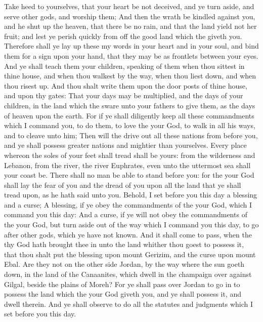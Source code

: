 \begin{biblechapter}
\verse Take heed to yourselves, that your heart be not deceived, and ye turn aside, and serve other gods, and worship them;
\verse And then the \LORDs wrath be kindled against you, and he shut up the heaven, that there be no rain, and that the land yield not her fruit; and lest ye perish quickly from off the good land which the \LORD giveth you.
\verse Therefore shall ye lay up these my words in your heart and in your soul, and bind them for a sign upon your hand, that they may be as frontlets between your eyes.
\verse And ye shall teach them your children, speaking of them when thou sittest in thine house, and when thou walkest by the way, when thou liest down, and when thou risest up.
\verse And thou shalt write them upon the door posts of thine house, and upon thy gates:
\verse That your days may be multiplied, and the days of your children, in the land which the \LORD sware unto your fathers to give them, as the days of heaven upon the earth.
\verse For if ye shall diligently keep all these commandments which I command you, to do them, to love the \LORD your God, to walk in all his ways, and to cleave unto him;
\verse Then will the \LORD drive out all these nations from before you, and ye shall possess greater nations and mightier than yourselves.
\verse Every place whereon the soles of your feet shall tread shall be yours: from the wilderness and Lebanon, from the river, the river Euphrates, even unto the uttermost sea shall your coast be.
\verse There shall no man be able to stand before you: for the \LORD your God shall lay the fear of you and the dread of you upon all the land that ye shall tread upon, as he hath said unto you.
\verse Behold, I set before you this day a blessing and a curse;
\verse A blessing, if ye obey the commandments of the \LORD your God, which I command you this day:
\verse And a curse, if ye will not obey the commandments of the \LORD your God, but turn aside out of the way which I command you this day, to go after other gods, which ye have not known.
\verse And it shall come to pass, when the \LORD thy God hath brought thee in unto the land whither thou goest to possess it, that thou shalt put the blessing upon mount Gerizim, and the curse upon mount Ebal.
\verse Are they not on the other side Jordan, by the way where the sun goeth down, in the land of the Canaanites, which dwell in the champaign over against Gilgal, beside the plains of Moreh?
\verse For ye shall pass over Jordan to go in to possess the land which the \LORD your God giveth you, and ye shall possess it, and dwell therein.
\verse And ye shall observe to do all the statutes and judgments which I set before you this day.
\end{biblechapter}

